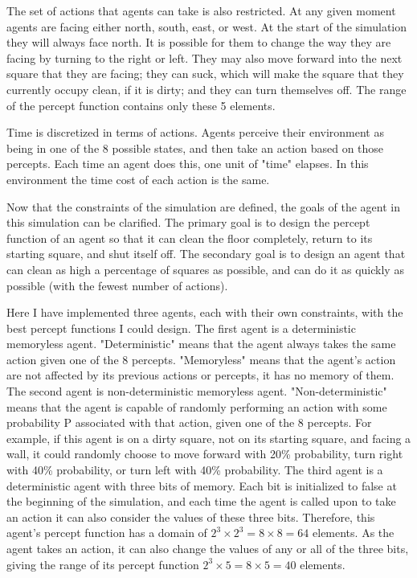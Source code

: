 \documentclass[10 pt.]{article}
\begin{document}
The set of actions that agents can take is also restricted. At any given moment agents are
facing either north, south, east, or west. At the start of the simulation they will always face north.
It is possible for them to change the way they are facing by turning to the right or left.
They may also move forward into the next square that they are facing; they can suck, which
will make the square that they currently occupy clean, if it is dirty; and they can turn
themselves off. The range of the percept function contains only these 5 elements.

Time is discretized in terms of actions. Agents perceive their environment as being in one of
the 8 possible states, and then take an action based on those percepts. Each time an agent does
this, one unit of "time" elapses. In this environment the time cost of each action is the same.

Now that the constraints of the simulation are defined, the goals of the agent in this
simulation can be clarified. The primary goal is to design the percept function of an agent so that it can clean the floor completely,
return to its starting square, and shut itself off. The secondary goal is to design an agent that
can clean as high a percentage of squares as possible, and can do it as quickly as possible
(with the fewest number of actions).

Here I have implemented three agents, each with their own constraints, with the best percept
functions I could design. The first agent is a deterministic memoryless agent. "Deterministic"
means that the agent always takes the same action given one of the 8 percepts. "Memoryless" means
that the agent's action are not affected by its previous actions or percepts, it has no memory of
them. The second agent is non-deterministic memoryless agent. "Non-deterministic" means that the
agent is capable of randomly performing an action with some probability P associated with that action, given
one of the 8 percepts. For example, if this agent is on a dirty square, not on its starting square,
 and facing a wall, it could randomly choose to move forward with 20\% probability, turn right with
40\% probability, or turn left with 40\% probability. The third agent is a deterministic agent with
three bits of memory. Each bit is initialized to false at the beginning of the simulation, and each
time the agent is called upon to take an action it can also consider the values of these three bits.
Therefore, this agent's percept function has a domain of $2^3 \times 2^3 = 8 \times 8 = 64$ elements. As the agent
takes an action, it can also change the values of any or all of the three bits, giving the range of
its percept function $2^3 \times 5 = 8 \times 5 = 40$ elements.
\end{document}
